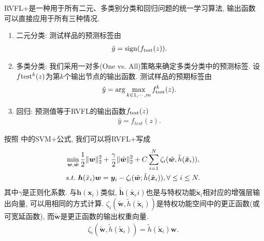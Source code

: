 RVFL+是一种用于所有二元、多类别分类和回归问题的统一学习算法, 输出函数可以直接应用于所有三种情况.
\begin{enumerate}
    \item 二元分类: 测试样品的预测标签由
\begin{align}
    \hat y = \textup{sign}(f_{\textup{test}}(z)).
\end{align}
    \item 多类分类: 我们采用一对多(One vs. All)策略来确定多类分类中的预测标签. 设$f{\textup{test}}^k(z)$为第$k$个输出节点的输出函数. 测试样品的预期标签由
\begin{align}
    \hat y = \arg \max_{ k \in 1,\cdots,m} f_{\textup{test}}^k (z).
\end{align}
  \item  回归: 预测值等于RVFL的输出函数$f_{\textup{test}}(z)$
\begin{align}
    \hat y = f_{test}(z).
\end{align}
\end{enumerate}

按照 \cite{VAPNIK2009544} 中的SVM+公式, 我们可以将RVFL+写成
\begin{align}
    &\min\limits_{{\bm w},\tilde {\bm w}} \frac 1 2 \|{\bm w}\|_2^ 2 + \frac \gamma 2 \|\tilde {\bm w}\|_2^ 2 + C\sum_{i=1}^N \zeta_i (\tilde {\bm w}, {\tilde h}({\tilde {\bm x}}_i)),\notag\\
    &s.t.\,\, \bm h(\tilde x_i){\bm w} = \bm y_i - \zeta_i (\tilde {\bm w}; {\tilde h}({\tilde {\bm x}}_i)), \forall \leq i \leq  N.
    \label{RVFL20181102eq8}
\end{align}
其中$\gamma$是正则化系数. 与$\bm h(\bm x_i)$类似, ${\tilde{\bm h}}({\tilde{\bm x_r}}i)$也是与特权功能${\tilde{\bm x}_i}$相对应的增强层输出向量, 可以用相同的方式计算.
$\zeta_i(\tilde{\bm w},{\tilde h}(\tilde{\bm x}_i))$是特权功能空间中的更正函数(或可宽延函数), 而$\tilde{\bm w}$是更正函数的输出权重向量.
\begin{align}\label{RVFL20181102eq9}
    \zeta_i (\tilde {\bm w}, {\tilde h}({\tilde {\bm x}}_i)) = {\tilde h}({\tilde {\bm x}}_i){\bm w}.
\end{align}

